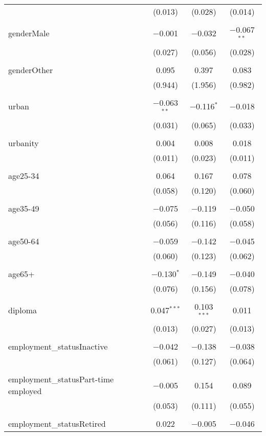 \begin{tabular}{@{\extracolsep{5pt}}lccc}
  & (0.013) & (0.028) & (0.014) \\ 
  & & & \\ 
 genderMale & $-$0.001 & $-$0.032 & $-$0.067$^{**}$ \\ 
  & (0.027) & (0.056) & (0.028) \\ 
  & & & \\ 
 genderOther & 0.095 & 0.397 & 0.083 \\ 
  & (0.944) & (1.956) & (0.982) \\ 
  & & & \\ 
 urban & $-$0.063$^{**}$ & $-$0.116$^{*}$ & $-$0.018 \\ 
  & (0.031) & (0.065) & (0.033) \\ 
  & & & \\ 
 urbanity & 0.004 & 0.008 & 0.018 \\ 
  & (0.011) & (0.023) & (0.011) \\ 
  & & & \\ 
 age25-34 & 0.064 & 0.167 & 0.078 \\ 
  & (0.058) & (0.120) & (0.060) \\ 
  & & & \\ 
 age35-49 & $-$0.075 & $-$0.119 & $-$0.050 \\ 
  & (0.056) & (0.116) & (0.058) \\ 
  & & & \\ 
 age50-64 & $-$0.059 & $-$0.142 & $-$0.045 \\ 
  & (0.060) & (0.123) & (0.062) \\ 
  & & & \\ 
 age65+ & $-$0.130$^{*}$ & $-$0.149 & $-$0.040 \\ 
  & (0.076) & (0.156) & (0.078) \\ 
  & & & \\ 
 diploma & 0.047$^{***}$ & 0.103$^{***}$ & 0.011 \\ 
  & (0.013) & (0.027) & (0.013) \\ 
  & & & \\ 
 employment\_statusInactive & $-$0.042 & $-$0.138 & $-$0.038 \\ 
  & (0.061) & (0.127) & (0.064) \\ 
  & & & \\ 
 employment\_statusPart-time employed & $-$0.005 & 0.154 & 0.089 \\ 
  & (0.053) & (0.111) & (0.055) \\ 
  & & & \\ 
 employment\_statusRetired & 0.022 & $-$0.005 & $-$0.046 \\ 

\end{tabular}
